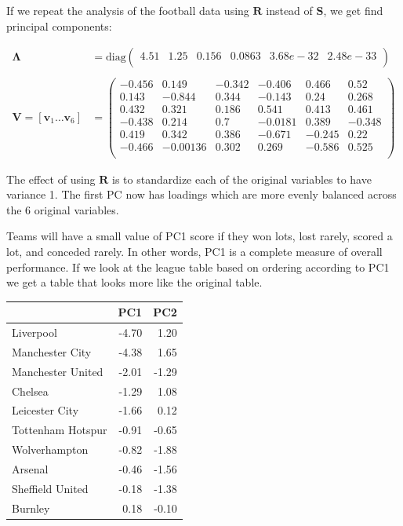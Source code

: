 \documentclass[
]{book}
\theoremstyle{definition}
\theoremstyle{definition}
\theoremstyle{definition}
\theoremstyle{definition}
\theoremstyle{remark}
\begin{document}
If we repeat the analysis of the football data using \(\mathbf R\) instead of \(\mathbf S\), we get find principal components:

\begin{align*}
\boldsymbol \Lambda&= \text{diag}\begin{pmatrix}4.51&1.25&0.156&0.0863&3.68e-32&2.48e-33 \\\end{pmatrix}\\
\;\\
\mathbf V= [\mathbf v_1 \ldots \mathbf v_6] &=\begin{pmatrix}-0.456&0.149&-0.342&-0.406&0.466&0.52 \\0.143&-0.844&0.344&-0.143&0.24&0.268 \\0.432&0.321&0.186&0.541&0.413&0.461 \\-0.438&0.214&0.7&-0.0181&0.389&-0.348 \\0.419&0.342&0.386&-0.671&-0.245&0.22 \\-0.466&-0.00136&0.302&0.269&-0.586&0.525 \\\end{pmatrix}
\end{align*}

The effect of using \(\mathbf R\) is to standardize each of the original variables to have variance 1.
The first PC now has loadings which are more evenly balanced across the 6 original variables.

Teams will have a small value of PC1 score if they won lots, lost rarely, scored a lot, and conceded rarely. In other words, PC1 is a complete measure of overall performance. If we look at the league table based on ordering according to PC1 we get a table that looks more like the original table.

\begin{tabular}{lrr}
\toprule
  & PC1 & PC2\\
\midrule
Liverpool & -4.70 & 1.20\\
Manchester City & -4.38 & 1.65\\
Manchester United & -2.01 & -1.29\\
Chelsea & -1.29 & 1.08\\
Leicester City & -1.66 & 0.12\\
\addlinespace
Tottenham Hotspur & -0.91 & -0.65\\
Wolverhampton & -0.82 & -1.88\\
Arsenal & -0.46 & -1.56\\
Sheffield United & -0.18 & -1.38\\
Burnley & 0.18 & -0.10\\
\bottomrule
\end{tabular}
\end{document}

